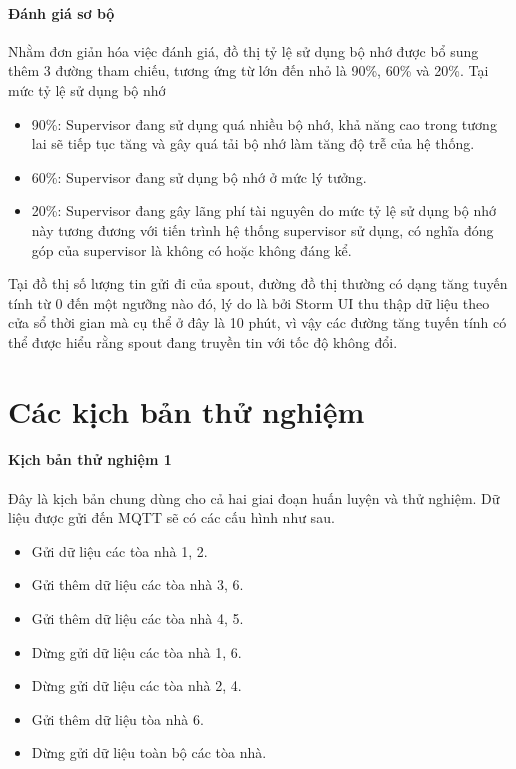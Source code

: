 \paragraph{Đánh giá sơ bộ}

Nhằm đơn giản hóa việc đánh giá, đồ thị tỷ lệ sử dụng bộ nhớ được bổ sung thêm 3 đường tham chiếu, tương ứng từ lớn đến nhỏ là 90\%, 60\% và 20\%. Tại mức tỷ lệ sử dụng bộ nhớ

\begin{itemize}
    \item 90\%: Supervisor đang sử dụng quá nhiều bộ nhớ, khả năng cao trong tương lai sẽ tiếp tục tăng và gây quá tải bộ nhớ làm tăng độ trễ của hệ thống.
    \item 60\%: Supervisor đang sử dụng bộ nhớ ở mức lý tưởng.
    \item 20\%: Supervisor đang gây lãng phí tài nguyên do mức tỷ lệ sử dụng bộ nhớ này tương đương với tiến trình hệ thống supervisor sử dụng, có nghĩa đóng góp của supervisor là không có hoặc không đáng kể.
\end{itemize}

Tại đồ thị số lượng tin gửi đi của spout, đường đồ thị thường có dạng tăng tuyến tính từ 0 đến một ngưỡng nào đó, lý do là bởi Storm UI thu thập dữ liệu theo cửa sổ thời gian mà cụ thể ở đây là 10 phút, vì vậy các đường tăng tuyến tính có thể được hiểu rằng spout đang truyền tin với tốc độ không đổi.

\section{Các kịch bản thử nghiệm}

\paragraph{Kịch bản thử nghiệm 1}

Đây là kịch bản chung dùng cho cả hai giai đoạn huấn luyện và thử nghiệm. Dữ liệu được gửi đến MQTT sẽ có các cấu hình như sau.

\begin{itemize}
    \item Gửi dữ liệu các tòa nhà 1, 2.
    \item Gửi thêm dữ liệu các tòa nhà 3, 6.
    \item Gửi thêm dữ liệu các tòa nhà 4, 5.
    \item Dừng gửi dữ liệu các tòa nhà 1, 6.
    \item Dừng gửi dữ liệu các tòa nhà 2, 4.
    \item Gửi thêm dữ liệu tòa nhà 6.
    \item Dừng gửi dữ liệu toàn bộ các tòa nhà.
\end{itemize}

